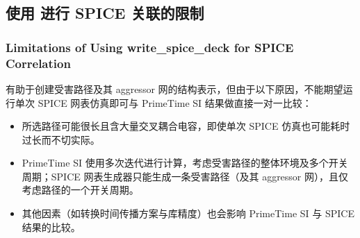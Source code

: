 \subsection{使用  进行 SPICE 关联的限制}
\subsubsection*{Limitations of Using write\_spice\_deck for SPICE Correlation}

 有助于创建受害路径及其 aggressor 网的结构表示，但由于以下原因，不能期望运行单次 SPICE 网表仿真即可与 PrimeTime SI 结果做直接一对一比较：
\begin{itemize}
  \item 所选路径可能很长且含大量交叉耦合电容，即使单次 SPICE 仿真也可能耗时过长而不切实际。
  \item PrimeTime SI 使用多次迭代进行计算，考虑受害路径的整体环境及多个开关周期；SPICE 网表生成器只能生成一条受害路径（及其 aggressor 网），且仅考虑路径的一个开关周期。
  \item 其他因素（如转换时间传播方案与库精度）也会影响 PrimeTime SI 与 SPICE 结果的比较。
\end{itemize}

